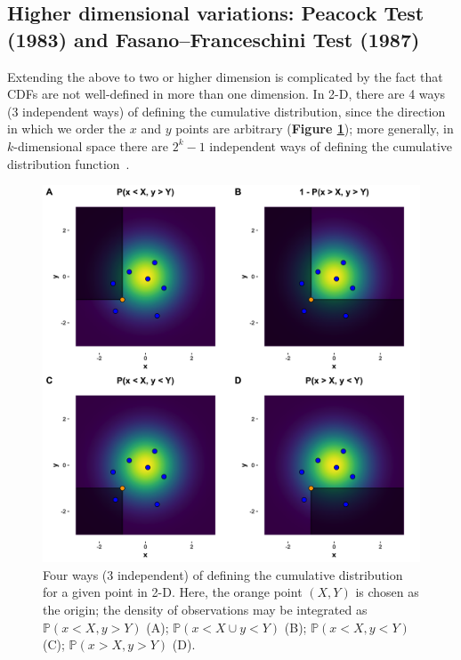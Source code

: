 \documentclass[codesnippet]{jss}
\begin{document}
\subsection{Higher dimensional variations: Peacock Test (1983) and Fasano--Franceschini Test (1987)}
Extending the above to two or higher dimension is complicated by the
fact that CDFs are not well-defined in more than one dimension.  In
2-D, there are 4 ways (3 independent ways) of defining the cumulative
distribution, since the direction in which we order the $x$ and $y$
points are arbitrary (\textbf{Figure \ref{fig:kstest2Dissue}}); more
generally, in $k$-dimensional space there are $2^{k}-1$ independent
ways of defining the cumulative distribution
function~\citep{Peacock1983}.

\begin{figure}[t!]
\centering
\includegraphics{CDF2Dissue}
\caption{\label{fig:kstest2Dissue} Four ways (3 independent) of defining the cumulative distribution for a given point in 2-D.  Here, the orange point $(X,Y)$ is chosen as the origin; the density of observations may be integrated as
$\mathbb{P}(x < X, y > Y)$ (A);
$\mathbb{P}(x < X \cup y < Y)$ (B);
$\mathbb{P}(x < X, y < Y)$ (C);
$\mathbb{P}(x > X, y > Y)$ (D).
}
\end{figure}
\end{document}
